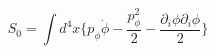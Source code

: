 \begin{equation}
S_0= \int d^4x \{p_{\phi} \dot \phi- \frac{p_{\phi}^2}{2}- 
 \frac{\partial_i\phi \partial_i \phi}{2}\}
\label{14} 
\end{equation}

